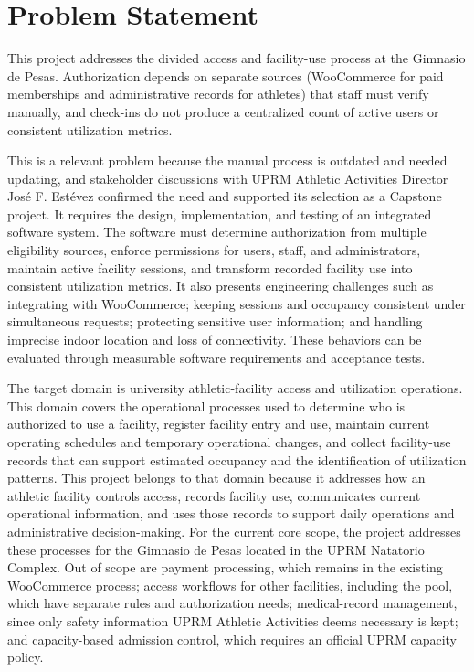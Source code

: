 \section{Problem Statement}

This project addresses the divided access and facility-use process at the Gimnasio de Pesas. Authorization depends on separate sources (WooCommerce for paid memberships and administrative records for athletes) that staff must verify manually, and check-ins do not produce a centralized count of active users or consistent utilization metrics.

This is a relevant problem because the manual process is outdated and needed updating, and stakeholder discussions with UPRM Athletic Activities Director José F. Estévez confirmed the need and supported its selection as a Capstone project. It requires the design, implementation, and testing of an integrated software system. The software must determine authorization from multiple eligibility sources, enforce permissions for users, staff, and administrators, maintain active facility sessions, and transform recorded facility use into consistent utilization metrics. It also presents engineering challenges such as integrating with WooCommerce; keeping sessions and occupancy consistent under simultaneous requests; protecting sensitive user information; and handling imprecise indoor location and loss of connectivity. These behaviors can be evaluated through measurable software requirements and acceptance tests.


The target domain is university athletic-facility access and utilization operations. This domain covers the operational processes used to determine who is authorized to use a facility, register facility entry and use, maintain current operating schedules and temporary operational changes, and collect facility-use records that can support estimated occupancy and the identification of utilization patterns. This project belongs to that domain because it addresses how an athletic facility controls access, records facility use, communicates current operational information, and uses those records to support daily operations and administrative decision-making. For the current core scope, the project addresses these processes for the Gimnasio de Pesas located in the UPRM Natatorio Complex. Out of scope are payment processing, which remains in the existing WooCommerce process; access workflows for other facilities, including the pool, which have separate rules and authorization needs; medical-record management, since only safety information UPRM Athletic Activities deems necessary is kept; and capacity-based admission control, which requires an official UPRM capacity policy.

